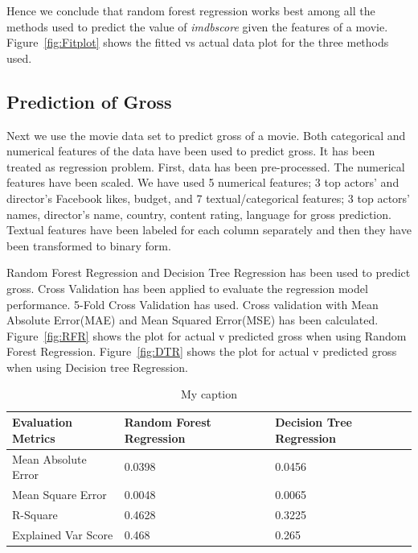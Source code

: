 \documentclass{article}%
\begin{document}
Hence we conclude that random forest regression works best among all the methods used to predict the value of \textit{imdbscore} given the features of a movie. Figure~\ref{fig:Fitplot} shows the fitted vs actual data plot for the three methods used. 

\subsection{Prediction of Gross}
Next we use the movie data set to predict gross of a movie. Both categorical and numerical features of the data have been used to predict gross. It has been treated as regression problem. First, data has been pre-processed. The numerical features have been scaled. We have used 5 numerical features; 3 top actors’ and director’s Facebook likes, budget, and 7 textual/categorical features; 3 top actors’ names, director’s name, country, content rating, language for gross prediction. Textual features have been labeled for each column separately and then they have been transformed to binary form. 

Random Forest Regression and Decision Tree Regression has been used to predict gross. Cross Validation has been applied to evaluate the regression model performance. 5-Fold Cross Validation has used. Cross validation with Mean Absolute Error(MAE) and Mean Squared Error(MSE) has been calculated. Figure~\ref{fig:RFR} shows the plot for actual v predicted gross when using Random Forest Regression. Figure~\ref{fig:DTR} shows the plot for actual v predicted gross when using Decision tree Regression.

\begin{table}[]
\centering
\caption{My caption}
\label{my-label}
\begin{tabular}{|l|l|l|}
\hline
Evaluation Metrics  & Random Forest Regression & Decision Tree Regression \\ \hline
Mean Absolute Error & 0.0398                   & 0.0456                   \\ \hline
Mean Square Error   & 0.0048                   & 0.0065                   \\ \hline
R-Square            & 0.4628                   & 0.3225                   \\ \hline
Explained Var Score & 0.468                    & 0.265                    \\ \hline
\end{tabular}
\end{table}
\end{document}
